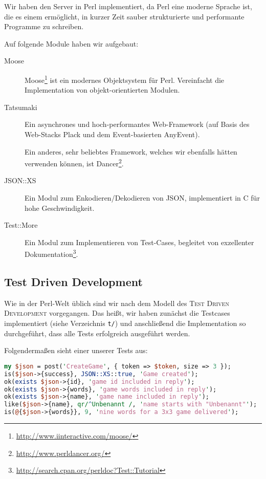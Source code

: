 \documentclass[12pt, a4paper]{scrartcl}
\begin{document}
Wir haben den Server in Perl implementiert, da Perl eine moderne Sprache ist,
die es einem ermöglicht, in kurzer Zeit sauber strukturierte und performante
Programme zu schreiben.
\np

Auf folgende Module haben wir aufgebaut:
\begin{description}
	\item[Moose] Moose\footnote{\url{http://www.iinteractive.com/moose/}}
	ist ein modernes Objektsystem für Perl. Vereinfacht die Implementation
	von objekt-orientierten Modulen.

	\item[Tatsumaki] Ein asynchrones und hoch-performantes Web-Framework
	(auf Basis des Web-Stacks Plack und dem Event-basierten AnyEvent).

	Ein anderes, sehr beliebtes Framework, welches wir ebenfalls hätten
	verwenden können, ist
	Dancer\footnote{\url{http://www.perldancer.org/}}.

	\item[JSON::XS] Ein Modul zum Enkodieren/Dekodieren von JSON,
	implementiert in C für hohe Geschwindigkeit.

	\item[Test::More] Ein Modul zum Implementieren von Test-Cases,
	begleitet von exzellenter
	Dokumentation\footnote{\url{http://search.cpan.org/perldoc?Test::Tutorial}}.
\end{description}

\subsection{Test Driven Development}

Wie in der Perl-Welt üblich sind wir nach dem Modell des \textsc{Test Driven
Development} vorgegangen. Das heißt, wir haben zunächst die Testcases
implementiert (siehe Verzeichnis \texttt{t/}) und anschließend die
Implementation so durchgeführt, dass alle Tests erfolgreich ausgeführt werden.
\np

Folgendermaßen sieht einer unserer Tests aus:
\begin{lstlisting}[language=Perl]
my $json = post('CreateGame', { token => $token, size => 3 });
is($json->{success}, JSON::XS::true, 'Game created');
ok(exists $json->{id}, 'game id included in reply');
ok(exists $json->{words}, 'game words included in reply');
ok(exists $json->{name}, 'game name included in reply');
like($json->{name}, qr/^Unbenannt /, 'name starts with "Unbenannt"');
is(@{$json->{words}}, 9, 'nine words for a 3x3 game delivered');
\end{lstlisting}
\end{document}
